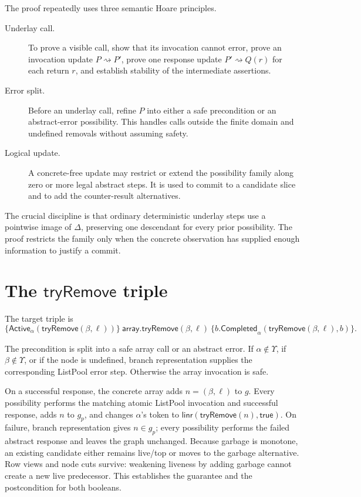 \documentclass[11pt]{article}
\theoremstyle{definition}
\theoremstyle{remark}
\newcommand{\Linr}{\mathsf{linr}}
\newcommand{\TryRemove}{\mathsf{tryRemove}}
\newcommand{\true}{\mathsf{true}}
\newcommand{\tran}{\mathrel{\rightsquigarrow}}
\begin{document}
The proof repeatedly uses three semantic Hoare principles.

\begin{description}
\item[Underlay call.] To prove a visible call, show that its invocation cannot
error, prove an invocation update \(P\tran P'\), prove one response update
\(P'\tran Q(r)\) for each return \(r\), and establish stability of the
intermediate assertions.

\item[Error split.] Before an underlay call, refine \(P\) into either a safe
precondition or an abstract-error possibility.  This handles calls outside
the finite domain and undefined removals without assuming safety.

\item[Logical update.] A concrete-free update may restrict or extend the
possibility family along zero or more legal abstract steps.  It is used to
commit to a candidate slice and to add the counter-result alternatives.
\end{description}

The crucial discipline is that ordinary deterministic underlay steps use a
pointwise image of \(\Delta\), preserving one descendant for every prior
possibility.  The proof restricts the family only when the concrete observation
has supplied enough information to justify a commit.

\section{The \texorpdfstring{\(\TryRemove\)}{tryRemove} triple}

The target triple is
\[
\boxed{
\{\mathsf{Active}_\alpha(\TryRemove(\beta,\ell))\}
\ \mathsf{array.tryRemove}(\beta,\ell)\ 
\{b.\mathsf{Completed}_\alpha(\TryRemove(\beta,\ell),b)\}.
}
\]

The precondition is split into a safe array call or an abstract error.  If
\(\alpha\notin\Upsilon\), if \(\beta\notin\Upsilon\), or if the node is
undefined, branch representation supplies the corresponding ListPool error
step.  Otherwise the array invocation is safe.

On a successful response, the concrete array adds
\(n=(\beta,\ell)\) to \(g\).  Every possibility performs the matching atomic
ListPool invocation and successful response, adds \(n\) to \(g_p\), and changes
\(\alpha\)'s token to \(\Linr(\TryRemove(n),\true)\).  On failure, branch
representation gives \(n\in g_p\); every possibility performs the failed
abstract response and leaves the graph unchanged.  Because garbage is
monotone, an existing candidate either remains live/top or moves to the
garbage alternative.  Row views and node cuts survive: weakening liveness by
adding garbage cannot create a new live predecessor.  This establishes the
guarantee and the postcondition for both booleans.
\end{document}
